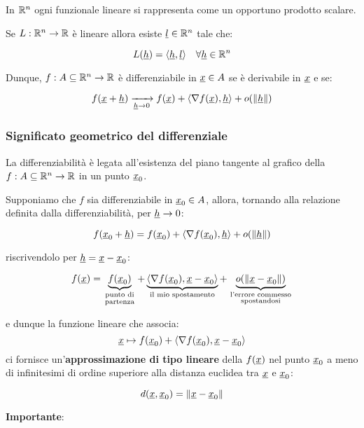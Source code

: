 In \(\mathbb{R}^{n} \) ogni funzionale lineare si rappresenta come un opportuno prodotto scalare.


Se \(L: \mathbb{R}^{n} \rightarrow \mathbb{R} \) è lineare allora esiste \(\underline{l} \in \mathbb{R}^{n} \) tale che:

\[
    L(\underline{h} ) = \langle \underline{h} , \underline{l} \rangle \quad \forall \underline{h} \in \mathbb{R}^{n}
\]

Dunque, \(f: A \subseteq \mathbb{R}^{n} \rightarrow \mathbb{R} \) è differenziabile in \(\underline{x} \in A\) se è derivabile in \(\underline{x} \) e se:

\[
    f(\underline{x} + \underline{h} ) \xrightarrow[\underline{h} \to 0]{} f(\underline{x} ) + \langle \nabla f(\underline{x} ), \underline{h}  \rangle + o(\left\lVert\underline{h}\right\rVert)
\]

\subsubsection{Significato geometrico del differenziale}

La differenziabilità è legata all'esistenza del piano tangente al grafico della \(f: A \subseteq \mathbb{R}^{n} \to \mathbb{R} \) in un punto \(\underline{x}_0\).

Supponiamo che \(f\) sia differenziabile in \(\underline{x}_0 \in A \), allora, tornando alla relazione definita dalla differenziabilità, per \(\underline{h} \to 0\):

\[
    f(\underline{x}_0+\underline{h}) = f(\underline{x}_0) +\langle \nabla f(\underline{x}_0) , \underline{h} \rangle  + o(\left\lVert\underline{h}\right\rVert )
\]

riscrivendolo per \(\underline{h} = \underline{x} - \underline{x}_0\):

\[
    f(\underline{x}) = \underbrace{f(\underline{x}_0)}_{\begin{smallmatrix}\text{punto di} \\ \text{partenza}\end{smallmatrix}} + \underbrace{\langle \nabla f(\underline{x}_0), \underline{x}-\underline{x}_0 \rangle}_\text{il mio spostamento} + \underbrace{o(\left\lVert\underline{x}-\underline{x}_0\right\rVert)}_{\begin{smallmatrix}\text{l'errore commesso} \\ \text{spostandosi}\end{smallmatrix}}
\]

e dunque la funzione lineare che associa:
\[\underline{x} \mapsto  f(\underline{x}_0 ) + \langle \nabla f(\underline{x}_0 ), \underline{x}-\underline{x}_0 \rangle \]
ci fornisce un'\textbf{approssimazione di tipo lineare} della \(f(\underline{x})\) nel punto \(\underline{x}_0\) a meno di infinitesimi di ordine superiore alla distanza euclidea tra \(\underline{x} \) e \(\underline{x}_0\):

\[
    d(\underline{x},\underline{x}_0) = \left\lVert\underline{x}-\underline{x}_0\right\rVert
\]

\textbf{Importante}:

